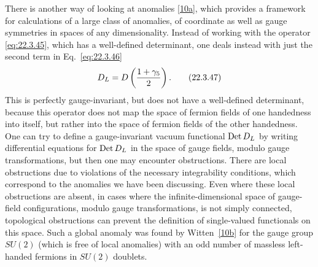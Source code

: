 There is another way of looking at anomalies
\hyperref[ch22-ref-10a]{[10a]}, which provides a framework for calculations
of a large class of anomalies, of coordinate as well as gauge symmetries
in spaces of any dimensionality. Instead of working with the operator
\eqref{eq:22.3.45}, which has a well-defined determinant, one deals instead
with just the second term in Eq.~\eqref{eq:22.3.46}
\begin{equation}
 \sl{D}_L=\sl{D}\left(\frac{1+\gamma_5}{2}\right).
 \tag{22.3.47}\label{eq:22.3.47}
\end{equation}
This is perfectly gauge-invariant, but does not have a well-defined
determinant, because this operator does not map the space of fermion fields
of one handedness into itself, but rather into the space of fermion fields
of the other handedness. One can try to define a gauge-invariant vacuum
functional $\operatorname{Det}\sl{D}_L$ by writing differential equations
for $\operatorname{Det}\sl{D}_L$ in the space of gauge fields, modulo gauge
transformations, but then one may encounter obstructions. There are local
obstructions due to violations of the necessary integrability conditions,
which correspond to the anomalies we have been discussing. Even where
these local obstructions are absent, in cases where the
infinite-dimensional space of gauge-field configurations, modulo gauge
transformations, is not simply connected, topological obstructions can
prevent the definition of single-valued functionals on this space. Such a
global anomaly was found by Witten~\hyperref[ch22-ref-10b]{[10b]} for the
gauge group $SU(2)$ (which is free of local anomalies) with an odd number
of massless left-handed fermions in $SU(2)$ doublets.
